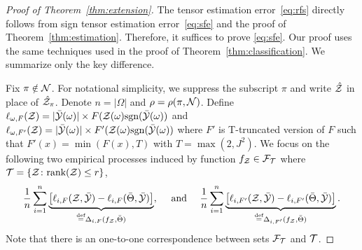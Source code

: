 \documentclass[11pt]{article}
\theoremstyle{plain}
\theoremstyle{definition}
\newcommand*{\KeepStyleUnderBrace}[1]{%
  \mathop{%
    \mathchoice
    {\underbrace{\displaystyle#1}}%
    {\underbrace{\textstyle#1}}%
    {\underbrace{\scriptstyle#1}}%
    {\underbrace{\scriptscriptstyle#1}}%
  }\limits
}
\def\sign{\textup{sgn}}
\def\rank{\textup{rank}}
\begin{document}
\begin{proof}[Proof of Theorem~\ref{thm:extension}]
The tensor estimation error~\eqref{eq:rfs}  directly follows from sign tensor estimation error~\eqref{eq:sfe} and the proof of Theorem~\ref{thm:estimation}.
Therefore, it suffices to prove \eqref{eq:sfe}. Our  proof uses  the same techniques used in the proof of  Theorem~\ref{thm:classification}. We summarize only the key difference.

Fix $\pi\notin\mathcal{N}$. For notational simplicity, we suppress the subscript $\pi$ and write $\hat {\mathcal{Z}}$ in place of $\hat {\mathcal{Z}}_\pi$. Denote $n=|\Omega|$ and $\rho=\rho(\pi, \mathcal{N})$.  
Define $\ell_{\omega,F}(\tZ) =  |\bar\tY(\omega)|\times F(\tZ(\omega)\sign(\bar \tY(\omega))$ and $\ell_{\omega,F'}(\tZ) =  |\bar\tY(\omega)|\times F'(\tZ(\omega)\sign(\bar \tY(\omega))$ where $F'$ is T-truncated version of $F$ such that $F'(x) =  \min(F(x),T)$ with $T=\max(2,J^2)$.  
We focus on the following two empirical processes induced by function $f_{\mathcal{Z}}\in \mathcal{F}_{\mathcal{T}}$ where $\tT=\{\tZ\colon \rank(\tZ)\leq r\}$,
\begin{align}\label{eq:empirical}
{1\over n}\sum_{i=1}^n \KeepStyleUnderBrace{\left[\ell_{i,F}(\tZ, \bar \tY)-\ell_{i,F}(\bar \Theta, \bar \tY)\right]}_{\stackrel{\text{def}}{=}\Delta_{i,F}(f_\tZ, \bar\Theta)},\quad\text { and }\quad  {1\over n}\sum_{i=1}^n \KeepStyleUnderBrace{\left[\ell_{i,F'}(\tZ, \bar \tY)-\ell_{i,F'}(\bar \Theta, \bar \tY)\right]}_{\stackrel{\text{def}}{=}\Delta_{i,F'}(f_\tZ, \bar\Theta)}.
\end{align}
Note that there is an one-to-one correspondence between sets $\mathcal{F}_{\mathcal{T}}$ and $\mathcal{T}$. 


\end{proof}
\end{document}
